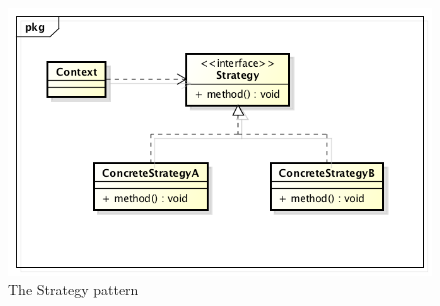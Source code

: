 \documentclass[../main/main.tex]{subfiles}
\begin{document}
\begin{figure}
  \includegraphics{../figures/strategy.png}  
  \caption{The Strategy pattern}
  \label{fig:strategy}
\end{figure}
\end{document}
